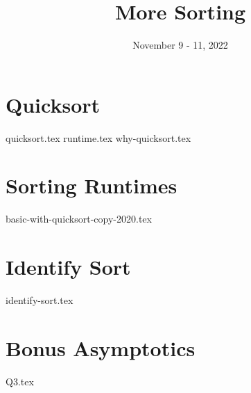 \documentclass[11pt]{exam}
\title{More Sorting}
\date{November 9 - 11, 2022}
\begin{document}
\maketitle

\section{Quicksort}
\begin{questions}
{quicksort.tex}
\vspace{30mm}
{runtime.tex}
\vspace{15mm}
{why-quicksort.tex}
\end{questions}
\clearpage

\pagebreak
\section{Sorting Runtimes}
\begin{questions}
{basic-with-quicksort-copy-2020.tex}
\end{questions}

\pagebreak
\section{Identify Sort}
\begin{questions}
{identify-sort.tex}
\end{questions}

\pagebreak
\section{Bonus Asymptotics}
\begin{questions}
{Q3.tex}
\end{questions}
\end{document}
